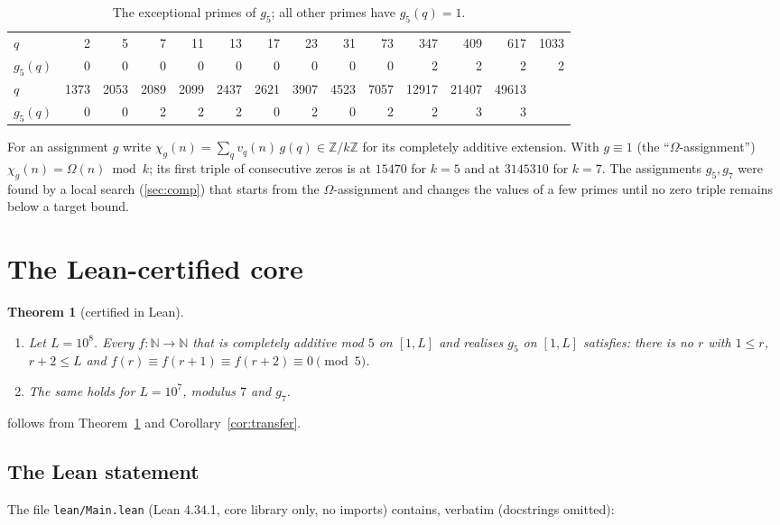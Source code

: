 \documentclass[11pt]{article}
\numberwithin{equation}{section}
\newtheorem{theorem}{Theorem}[section]
\theoremstyle{definition}
\theoremstyle{remark}
\newcommand{\Z}{\mathbb Z}
\newcommand{\N}{\mathbb N}
\begin{document}
\begin{table}[h]
\centering\small
\setlength{\tabcolsep}{4pt}
\begin{tabular}{@{}l*{13}{r}@{}}
\toprule
$q$      & 2 & 5 & 7 & 11 & 13 & 17 & 23 & 31 & 73 & 347 & 409 & 617 & 1033 \\
$g_5(q)$ & 0 & 0 & 0 & 0  & 0  & 0  & 0  & 0  & 0  & 2   & 2   & 2   & 2 \\
\midrule
$q$      & 1373 & 2053 & 2089 & 2099 & 2437 & 2621 & 3907 & 4523 & 7057 & 12917 & 21407 & 49613 & \\
$g_5(q)$ & 0    & 0    & 2    & 2    & 2    & 0    & 2    & 0    & 2    & 2     & 3     & 3 & \\
\bottomrule
\end{tabular}
\caption{The exceptional primes of $g_5$; all other primes have $g_5(q)=1$.}\label{tab:g5}
\end{table}

For an assignment $g$ write $\chi_g(n)=\sum_{q}v_q(n)\,g(q)\in\Z/k\Z$ for its completely additive
extension. With $g\equiv1$ (the ``$\Omega$-assignment'') $\chi_g(n)=\Omega(n)\bmod k$; its first triple
of consecutive zeros is at $15470$ for $k=5$ and at $3145310$ for $k=7$. The assignments $g_5,g_7$ were
found by a local search (\cref{sec:comp}) that starts from the $\Omega$-assignment and changes the values
of a few primes until no zero triple remains below a target bound.

\section{The Lean-certified core}\label{sec:lean}

\begin{theorem}[certified in Lean]\label{thm:core}
\leavevmode
\begin{enumerate}
\item Let $L=10^8$. Every $f:\N\to\N$ that is completely additive mod $5$ on $[1,L]$ and realises
$g_5$ on $[1,L]$ satisfies: there is no $r$ with $1\le r$, $r+2\le L$ and
$f(r)\equiv f(r+1)\equiv f(r+2)\equiv0\pmod5$.
\item The same holds for $L=10^7$, modulus $7$ and $g_7$.
\end{enumerate}
\end{theorem}

 follows from Theorem~\ref{thm:core} and Corollary~\ref{cor:transfer}.

\subsection{The Lean statement}
The file \texttt{lean/Main.lean} (Lean 4.34.1, core library only, no imports) contains, verbatim
(docstrings omitted):
\end{document}
